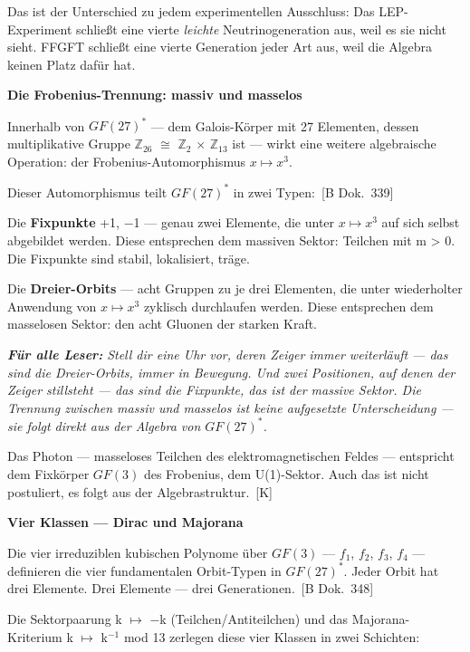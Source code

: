 \documentclass[11pt,oneside]{book}
\newcommand{\status}[1]{\penalty10000\,{\scriptsize\textcolor{gray!60}{[#1]}}}
\newenvironment{laierspur}{%
  \par\vspace{4pt}%
  \noindent\small\itshape\color{blue!60!black}%
  \textbf{Für alle Leser:}\enspace\ignorespaces}{%
  \par\vspace{4pt}\normalsize\normalfont\normalcolor}
\begin{document}
Das ist der Unterschied zu jedem experimentellen Ausschluss: Das LEP-Experiment
schließt eine vierte \textit{leichte} Neutrinogeneration aus, weil es sie nicht
sieht. FFGFT schließt eine vierte Generation jeder Art aus, weil die
Algebra keinen Platz dafür hat.


\textbf{Die Frobenius-Trennung: massiv und masselos}


Innerhalb von $GF(27)^*$ — dem Galois-Körper mit 27 Elementen, dessen
multiplikative Gruppe $\mathbb{Z}_{26}$ $\cong$ $\mathbb{Z}_2$ $\times$ $\mathbb{Z}_{13}$ ist — wirkt eine weitere
algebraische Operation: der Frobenius-Automorphismus $x \mapsto x^3$.


Dieser Automorphismus teilt $GF(27)^*$ in zwei Typen: \status{B Dok.~339}


Die \textbf{Fixpunkte} {+1, $-$1} — genau zwei Elemente, die unter $x \mapsto x^3$
auf sich selbst abgebildet werden. Diese entsprechen dem massiven Sektor:
Teilchen mit m > 0. Die Fixpunkte sind stabil, lokalisiert, träge.


Die \textbf{Dreier-Orbits} — acht Gruppen zu je drei Elementen, die unter
wiederholter Anwendung von $x \mapsto x^3$ zyklisch durchlaufen werden. Diese
entsprechen dem masselosen Sektor: den acht Gluonen der starken Kraft.


\begin{laierspur}
Stell dir eine Uhr vor, deren Zeiger immer weiterläuft —
das sind die Dreier-Orbits, immer in Bewegung. Und zwei Positionen,
auf denen der Zeiger stillsteht — das sind die Fixpunkte, das ist der
massive Sektor. Die Trennung zwischen massiv und masselos ist keine
aufgesetzte Unterscheidung — sie folgt direkt aus der Algebra von $GF(27)^*$.
\end{laierspur}

Das Photon — masseloses Teilchen des elektromagnetischen Feldes — entspricht
dem Fixkörper $GF(3)$ des Frobenius, dem U(1)-Sektor. Auch das ist nicht
postuliert, es folgt aus der Algebrastruktur. \status{K}


\textbf{Vier Klassen — Dirac und Majorana}


Die vier irreduziblen kubischen Polynome über $GF(3)$ — $f_1$, $f_2$, $f_3$, $f_4$ —
definieren die vier fundamentalen Orbit-Typen in $GF(27)^*$. Jeder Orbit
hat drei Elemente. Drei Elemente — drei Generationen. \status{B Dok.~348}


Die Sektorpaarung k $\mapsto$ $-$k (Teilchen/Antiteilchen) und das Majorana-Kriterium
k $\mapsto$ k$^{-1}$ mod 13 zerlegen diese vier Klassen in zwei Schichten:
\end{document}
